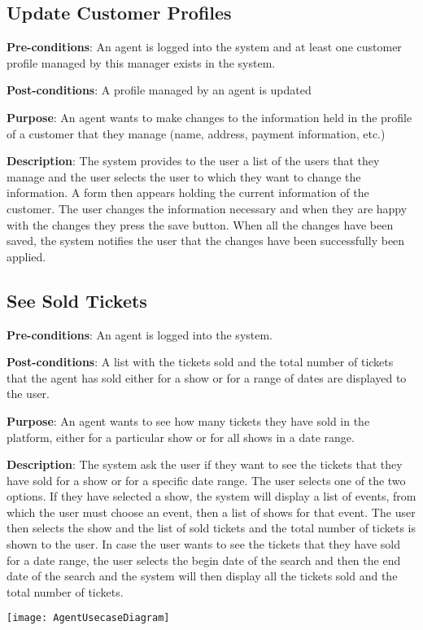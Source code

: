 \subsection{Update Customer Profiles}
\textbf{Pre-conditions}: An agent is logged into the system and at least
one customer profile managed by this manager exists in the system.

\textbf{Post-conditions}: A profile managed by an agent is updated

\textbf{Purpose}: An agent wants to make changes to the information
held in the profile of a customer that they manage (name, address,
payment information, etc.)

\textbf{Description}: The system provides to the user a list of the
users that they manage and the user selects the user to which
they want to change the information. A form then appears holding the
current information of the customer. The user changes the information
necessary and when they are happy with the changes they press the save
button. When all the changes have been saved, the system notifies
the user that the changes have been successfully been applied.

\subsection{See Sold Tickets}
\textbf{Pre-conditions}: An agent is logged into the system.

\textbf{Post-conditions}: A list with the tickets sold and the total number
of tickets that the agent has sold either for a show or for a range of dates
are displayed to the user.

\textbf{Purpose}: An agent wants to see how many tickets they have sold in the
platform, either for a particular show or for all shows in a date range.

\textbf{Description}: The system ask the user if they want to see the tickets that
they have sold for a show or for a specific date range. The user selects one of the two
options. If they have selected a show, the system will display a list of events, from
which the user must choose an event, then a list of shows for that event. The user then
selects the show and the list of sold tickets and the total number of tickets is shown
to the user. In case the user wants to see the tickets that they have sold for a date
range, the user selects the begin date of the search and then the end date of the
search and the system will then display all the tickets sold and the total number of
tickets.

\texttt{[image: AgentUsecaseDiagram]}
